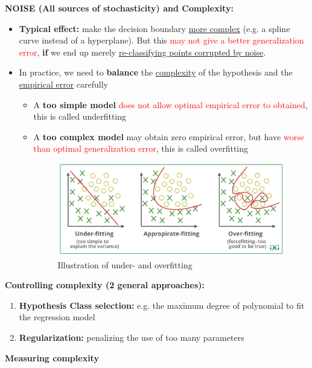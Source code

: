 \documentclass[12pt, a4paper]{article}
\begin{document}
\textbf{NOISE (All sources of stochasticity) and Complexity:}
\begin{itemize}
  \item \textbf{Typical effect:} make the decision boundary \uline{more complex} (e.g. a spline curve instead of a hyperplane). But this \textcolor{red}{may not give a better generalization error}, \textbf{if} we end up merely \uline{re-classifying points corrupted by noise}.
  \item In practice, we need to \textbf{balance} the \uline{complexity} of the hypothesis and the \uline{empirical error} carefully
  \begin{itemize}
    \item A \textbf{too simple model} \textcolor{red}{does not allow optimal empirical error to obtained}, this is called underfitting
    \item A \textbf{too complex model} may obtain zero empirical error, but have \textcolor{red}{worse than optimal generalization error}, this is called overfitting
    \begin{figure}[H]
      \centering  %
        \includegraphics[width=0.8\columnwidth]{images/underfit-appropriate-overfit.png}
        \caption{Illustration of under- and overfitting}
        \label{fig:underfit-appropriate-overfit}
    \end{figure}
  \end{itemize}
\end{itemize}


\textbf{Controlling complexity (2 general approaches):}
\begin{enumerate}
  \item \textbf{Hypothesis Class selection:} e.g. the maximum degree of polynomial to fit the regression model
  \item \textbf{Regularization:} penalizing the use of too many parameters
\end{enumerate}



\textbf{Measuring complexity}
\end{document}
